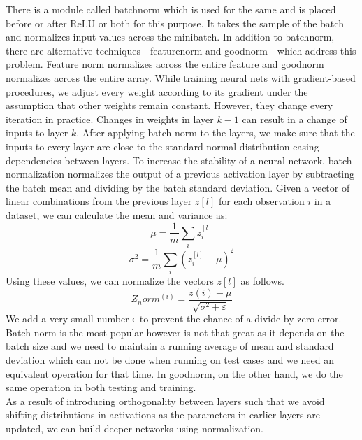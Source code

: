 There is a module called batchnorm which is used for the same and is placed before or after ReLU or both for this purpose. It takes the sample of the batch and normalizes input values across the minibatch. In addition to batchnorm, there are alternative techniques - featurenorm and goodnorm - which address this problem. Feature norm normalizes across the entire feature and goodnorm normalizes across the entire array. While training neural nets with gradient-based procedures, we adjust every weight according to its gradient under the assumption that other weights remain constant. However, they change every iteration in practice. Changes in weights in layer $k-1$ can result in a change of inputs to layer $k$. After applying batch norm to the layers, we make sure that the inputs to every layer are close to the standard normal distribution easing dependencies between layers. To increase the stability of a neural network, batch normalization normalizes the output of a previous activation layer by subtracting the batch mean and dividing by the batch standard deviation. Given a vector of linear combinations from the previous layer $z[l]$ for each observation $i$ in a dataset, we can calculate the mean and variance as: 
\begin{equation}
    \mu = \frac{1}{m} \sum_i z_i^{[l]}
\end{equation}
\begin{equation}
    \sigma^2 = \frac{1}{m} \sum_i (z_i^{[l]} - \mu)^2
\end{equation}
Using these values, we can normalize the vectors $z[l]$ as follows.
\begin{equation}
    Z_norm^(i) = \dfrac{z(i) - \mu}{\sqrt{\sigma^2+\varepsilon}}
\end{equation}
We add a very small number ϵ to prevent the chance of a divide by zero error.\\

Batch norm is the most popular however is not that great as it depends on the batch size and we need to maintain a running average of mean and standard deviation which can not be done when running on test cases and we need an equivalent operation for that time. In goodnorm, on the other hand, we do the same operation in both testing and training. \\

As a result of introducing orthogonality between layers such that we avoid shifting distributions in activations as the parameters in earlier layers are updated, we can build deeper networks using normalization.\\

